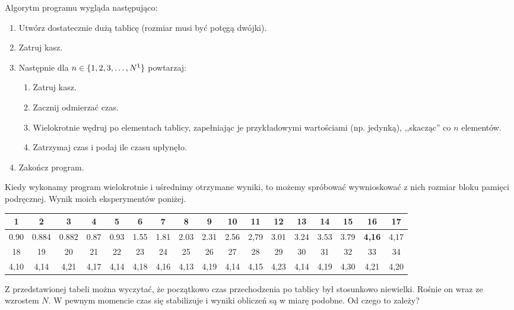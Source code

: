 \documentclass{article}
\begin{document}
Algorytm programu wygląda następująco:
 
\begin{enumerate}
    \item Utwórz dostatecznie dużą tablicę (rozmiar musi być potęgą dwójki).
    \item Zatruj kasz.
    \item Następnie dla $n \in \lbrace 1,2,3, \ldots, N\footnote{Liczba testów kontrolnych - u mnie jest to 37.} \rbrace$ powtarzaj:
    \begin{enumerate}
        \item Zatruj kasz.
        \item Zacznij odmierzać czas.
        \item Wielokrotnie wędruj po elementach tablicy, zapełniając je przykładowymi wartościami (np. jedynką), ,,skacząc'' co $n$ elementów.
        \item Zatrzymaj czas i podaj ile czasu upłynęło.
    \end{enumerate}
    \item Zakończ program.
   
\end{enumerate}
 
Kiedy wykonamy program wielokrotnie i uśrednimy otrzymane wyniki, to możemy spróbować wywnioskować z nich rozmiar bloku pamięci podręcznej. Wynik moich eksperymentów poniżej.
 
\begin{table}[h!]
\centering
\label{my-label}
\begin{tabular}{|c|c|c|c|c|c|c|c|c|c|c|c|c|c|c|c|c|}
\hline
1    & 2     & 3     & 4    & 5    & 6    & 7    & 8    & 9    & 10   & 11   & 12   & 13   & 14   & 15   & 16            & 17   \\ \hline
0.90 & 0.884 & 0.882 & 0.87 & 0.93 & 1.55 & 1.81 & 2.03 & 2.31 & 2.56 & 2,79 & 3.01 & 3.24 & 3.53 & 3.79 & \textbf{4,16} & 4,17 \\ \hline
18   & 19    & 20    & 21   & 22   & 23   & 24   & 25   & 26   & 27   & 28   & 29   & 30   & 31   & 32   & 33            & 34   \\ \hline
4,10 & 4,14  & 4,21  & 4,17 & 4,14 & 4,18 & 4,16 & 4,13 & 4,19 & 4,14 & 4,15 & 4,23 & 4,14 & 4,19 & 4,30 & 4,21          & 4,20 \\ \hline
\end{tabular}
\end{table}
 
Z przedstawionej tabeli można wyczytać, że początkowo czas przechodzenia po tablicy był stosunkowo niewielki. Rośnie on wraz ze wzrostem $N$. W pewnym momencie czas się stabilizuje i wyniki obliczeń są w miarę podobne. Od czego to zależy? \pagebreak
 
\end{document}
